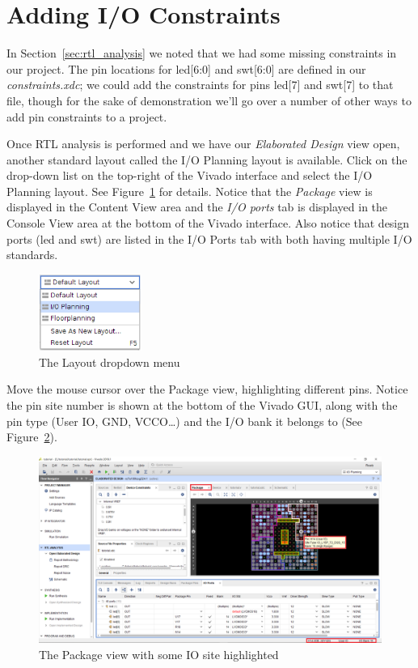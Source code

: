 \documentclass[11pt]{article}
\begin{document}
\section{Adding I/O Constraints}
\label{sec:add_cons}
In Section~\ref{sec:rtl_analysis} we noted that we had some missing constraints in our project. The pin locations for led[6:0] and swt[6:0] are defined in our \textit{constraints.xdc}; we could add the constraints for pins led[7] and swt[7] to that file, though for the sake of demonstration we'll go over a number of other ways to add pin constraints to a project.

Once RTL analysis is performed and we have our \textit{Elaborated Design} view open, another standard layout called the I/O Planning layout is available. Click on the drop-down list on the top-right of the Vivado interface and select the I/O Planning layout. See Figure~\ref{fig:io_plan} for details. Notice that the \textit{Package} view is displayed in the Content View area and the \textit{I/O ports} tab is displayed in the Console View area at the bottom of the Vivado interface. Also notice that design ports (led and swt) are listed in the I/O Ports tab with both having multiple I/O standards.

\begin{figure}[!h]
    \centering
    \includegraphics[width=0.3\textwidth]{images/io_plan.png}
    \caption{The Layout dropdown menu}
    \label{fig:io_plan}
\end{figure}

Move the mouse cursor over the Package view, highlighting different pins. Notice the pin site number is shown at the bottom of the Vivado GUI, along with the pin type (User IO, GND, VCCO…) and the I/O bank it belongs to (See Figure~\ref{fig:io_sites}). 

\begin{figure}[!h]
    \centering
    \includegraphics[width=\textwidth]{images/io_sites.png}
    \caption{The Package view with some IO site highlighted}
    \label{fig:io_sites}
\end{figure}
\end{document}
